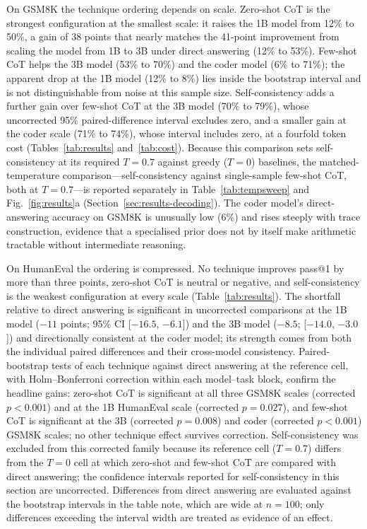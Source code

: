 \documentclass[conference]{IEEEtran}
\begin{document}
On GSM8K the technique ordering depends on scale.  Zero-shot CoT is
the strongest configuration at the smallest scale: it raises the 1B
model from 12\% to 50\%, a gain of 38 points that nearly matches the
41-point improvement from scaling the model from 1B to 3B under
direct answering (12\% to 53\%).  Few-shot CoT helps the 3B model
(53\% to 70\%) and the coder model (6\% to 71\%); the apparent drop at
the 1B model (12\% to 8\%) lies inside the bootstrap interval and is
not distinguishable from noise at this sample size.  Self-consistency
adds a further gain over few-shot CoT at the 3B model (70\% to 79\%),
whose uncorrected 95\% paired-difference interval excludes zero, and
a smaller gain at the coder scale (71\% to 74\%), whose interval
includes zero, at a fourfold token cost
(Tables~\ref{tab:results} and~\ref{tab:cost}).  Because this
comparison sets self-consistency at its required $T = 0.7$ against
greedy ($T = 0$) baselines, the matched-temperature
comparison---self-consistency against single-sample few-shot CoT,
both at $T = 0.7$---is reported separately in
Table~\ref{tab:tempsweep} and Fig.~\ref{fig:results}a
(Section~\ref{sec:results-decoding}).  The coder model's
direct-answering accuracy on GSM8K is unusually low (6\%) and rises
steeply with trace construction, evidence that a specialised prior
does not by itself make arithmetic tractable without intermediate
reasoning.

On HumanEval the ordering is compressed.  No technique improves
pass@1 by more than three points, zero-shot CoT is neutral or
negative, and self-consistency is the weakest configuration at every
scale (Table~\ref{tab:results}).  The shortfall relative to direct
answering is significant in uncorrected comparisons at the 1B model
($-11$ points; 95\% CI [$-16.5$, $-6.1$]) and the 3B model ($-8.5$;
[$-14.0$, $-3.0$]) and directionally consistent at the coder model;
its strength comes from both the individual paired differences and
their cross-model consistency.  Paired-bootstrap tests of each
technique against direct answering at the reference cell, with
Holm--Bonferroni correction within each model--task block, confirm
the headline gains: zero-shot CoT is significant at all three GSM8K
scales (corrected $p < 0.001$) and at the 1B HumanEval scale
(corrected $p = 0.027$), and few-shot CoT is significant at the 3B
(corrected $p = 0.008$) and coder (corrected $p < 0.001$) GSM8K
scales; no other technique effect survives correction.
Self-consistency was excluded from this corrected family because its
reference cell ($T = 0.7$) differs from the $T = 0$ cell at which
zero-shot and few-shot CoT are compared with direct answering; the
confidence intervals reported for self-consistency in this section
are uncorrected.  Differences from direct answering are evaluated
against the bootstrap intervals in the table note, which are wide at
$n = 100$; only differences exceeding the interval width are treated
as evidence of an effect.
\end{document}
